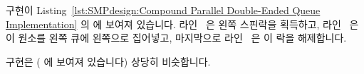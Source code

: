 \begin{fcvref}
 구현이
Listing~\ref{lst:SMPdesign:Compound Parallel Double-Ended Queue Implementation}
의  에 보여져 있습니다.
라인~ 은 왼쪽 스핀락을 획득하고, 라인~ 은 이 원소를
왼쪽 큐에 왼쪽으로 집어넣고, 마지막으로 라인~ 은 이 락을
해제합니다.
\end{fcvref}
\begin{fcvref}
 구현은 ( 에 보여져 있습니다) 상당히
비슷합니다.
\end{fcvref}

